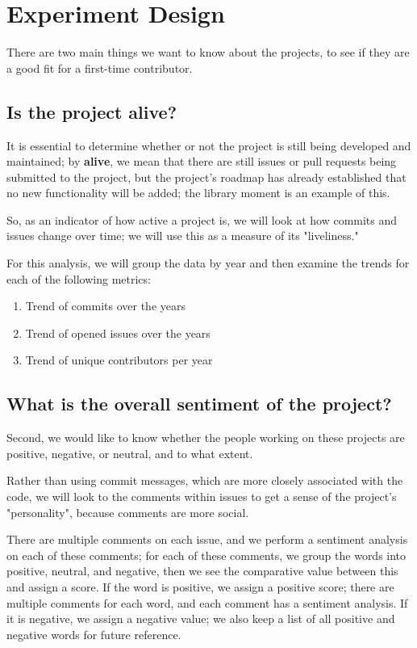 \section{Experiment Design}
There are two main things we want to know about the projects, to see if they are a good fit for a first-time contributor.

\subsection{Is the project alive?}
It is essential to determine whether or not the project is still being developed and maintained; by \textbf{alive}, we mean that there are still issues or pull requests being submitted to the project, but the project's roadmap has already established that no new functionality will be added; the library moment \cite{moment} is an example of this.

So, as an indicator of how active a project is, we will look at how commits and issues change over time; we will use this as a measure of its "liveliness."

For this analysis, we will group the data by year and then examine the trends for each of the following metrics:
\begin{enumerate}
    \fontsize{10pt}{10pt}
    \selectfont
    \item Trend of commits over the years
    \item Trend of opened issues over the years
    \item Trend of unique contributors per year
\end{enumerate}

\subsection{What is the overall sentiment of the project?}
Second, we would like to know whether the people working on these projects are positive, negative, or neutral, and to what extent.

Rather than using commit messages, which are more closely associated with the code, we will look to the comments within issues to get a sense of the project's "personality", because comments are more social.

There are multiple comments on each issue, and we perform a sentiment analysis on each of these comments; for each of these comments, we group the words into positive, neutral, and negative, then we see the comparative value between this and assign a score. If the word is positive, we assign a positive score; there are multiple comments for each word, and each comment has a sentiment analysis. If it is negative, we assign a negative value; we also keep a list of all positive and negative words for future reference. 

\pagebreak